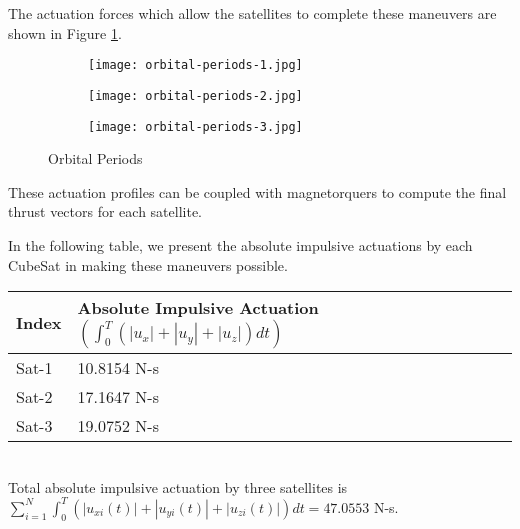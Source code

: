 The actuation forces which allow the satellites to complete these
maneuvers are shown in Figure \ref{fig:orbitals}.

\begin{figure}
\centering

\begin{subfigure}{0.4\textwidth}
\texttt{[image: orbital-periods-1.jpg]}
\end{subfigure}
\hfill
\begin{subfigure}{0.4\textwidth}
\texttt{[image: orbital-periods-2.jpg]}
\end{subfigure}
\hfill
\begin{subfigure}{0.4\textwidth}
\texttt{[image: orbital-periods-3.jpg]}
\end{subfigure}

\caption{Orbital Periods}
\label{fig:orbitals}
\end{figure}

These actuation profiles can be coupled with magnetorquers to compute
the final thrust vectors for each satellite.

In the following table, we present the absolute impulsive actuations
by each CubeSat in making these maneuvers possible.

\begin{tabular}{|l|l|}
\hline
Index & Absolute Impulsive Actuation $(\int_{0}^{T} (|u_x| + |u_y| + |u_z|) dt)$\\
\hline
Sat-1 & 10.8154 N-s\\
Sat-2 & 17.1647 N-s\\
Sat-3 & 19.0752 N-s\\
\hline
\end{tabular}
\\

Total absolute impulsive actuation by three satellites is
$\sum_{i=1}^{N} \int_{0}^{T} (|u_{xi}(t)| + |u_{yi}(t)| + |u_{zi}(t)|) dt = 47.0553$ N-s.
